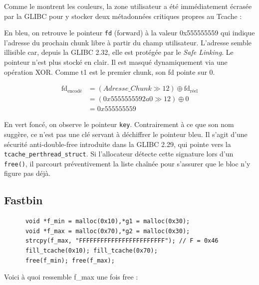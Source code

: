 Comme le montrent les couleurs, la zone utilisateur a été immédiatement écrasée par la GLIBC pour y stocker deux métadonnées critiques propres au Tcache :

En \textcolor{pwndbgblue}{bleu}, on retrouve le pointeur \texttt{fd} (forward) à la valeur 0x555555559 qui
indique l'adresse du prochain chunk libre à partir du champ utilisateur.
L'adresse semble illisible car, depuis la GLIBC 2.32, elle est protégée
par le \textit{Safe Linking}. Le pointeur n'est plus stocké en clair.
Il est masqué dynamiquement via une opération XOR.
Comme t1 est le premier chunk, son fd pointe sur 0.

$$
    \begin{aligned}
        \text{fd}_{\text{encodé}} & =  (Adresse\_Chunk \gg 12) \oplus \text{fd}_{\text{réel}} \\
                                  & = (0x5555555592a0 \gg 12) \oplus 0                        \\
                                  & =  0x555555559
    \end{aligned}
$$


En \textcolor{pwndbgdarkgreen}{vert foncé}, on observe le pointeur \texttt{key}.
Contrairement à ce que son nom suggère, ce n'est pas une clé servant à déchiffrer
le pointeur bleu. Il s'agit d'une sécurité anti-double-free introduite
dans la GLIBC 2.29, qui pointe vers la \texttt{tcache\_perthread\_struct}.
Si l'allocateur détecte cette signature lors d'un \texttt{free()},
il parcourt préventivement la liste chaînée pour s'assurer que le bloc n'y figure pas
déjà.

\subsection{Fastbin}
\begin{verbatim}
      void *f_min = malloc(0x10),*g1 = malloc(0x30);
      void *f_max = malloc(0x70),*g2 = malloc(0x30);
      strcpy(f_max, "FFFFFFFFFFFFFFFFFFFFFFFF"); // F = 0x46
      fill_tcache(0x10); fill_tcache(0x70);
      free(f_min); free(f_max);
\end{verbatim}

Voici à quoi ressemble f\_max une fois free :

